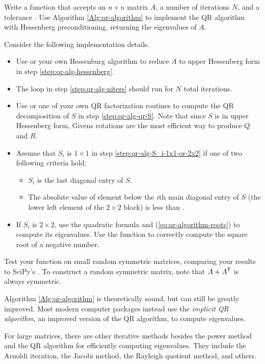 \begin{problem}
Write a function that accepts an $n \times n$ matrix $A$, a number of iterations $N$, and a tolerance .
Use Algorithm \ref{Alg:qr-algorithm} to implement the QR algorithm with Hessenberg preconditioning, returning the eigenvalues of $A$.

Consider the following implementation details.
\begin{itemize}
    \item Use  or your own Hessenburg algorithm to reduce $A$ to upper Hessenberg form in step \ref{step:qr-alg-hessenberg}.
    \item The loop in step \ref{step:qr-alg-niters} should run for $N$ total iterations.
    \item Use  or one of your own QR factorization routines to compute the QR decomposition of $S$ in step \ref{step:qr-alg-qr-S}.
    Note that since $S$ is in upper Hessenberg form, Givens rotations are the most efficient way to produce $Q$ and $R$.
    \item Assume that $S_i$ is $1 \times 1$ in step \ref{step:qr-alg-S_i-1x1-or-2x2} if one of two following criteria hold:
    \begin{itemize}
        \item $S_i$ is the last diagonal entry of $S$.
        \item The absolute value of element below the $i$th main diagonal entry of $S$ (the lower left element of the $2\times 2$ block) is less than .
    \end{itemize}
    \item If $S_i$ is $2 \times 2$, use the quadratic formula and (\ref{eq:qr-algorithm-roots}) to compute its eigenvalues.
    Use the function  to correctly compute the square root of a negative number.
\end{itemize}

Test your function on small random symmetric matrices, comparing your results to SciPy's .
To construct a random symmetric matrix, note that $A + A^{\mathsf T}$ is always symmetric.
\end{problem}

\begin{info}
Algorithm \ref{Alg:qr-algorithm} is theoretically sound, but can still be greatly improved.
Most modern computer packages instead use the \emph{implicit QR algorithm}, an improved version of the QR algorithm, to compute eigenvalues.

For large matrices, there are other iterative methods besides the power method and the QR algorithm for efficiently computing eigenvalues.
They include the Arnoldi iteration, the Jacobi method, the Rayleigh quotient method, and others.
\end{info}

